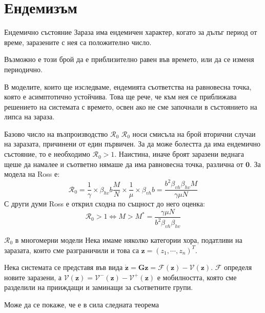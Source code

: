 \section{Ендемизъм}
\begin{frame}[t]{Ендемично състояние}
  Зараза има ендемичен характер, когато за дълъг период от време, заразените с нея са положително число.

  Възможно е този брой да е приблизително равен във времето, или да се изменя периодично.

  В моделите, които ще изследваме, ендемията съответства на равновесна точка, която е асимптотично устойчива. Това ще рече, че към нея се приближава решението на системата с времето, освен ако не сме започнали в състоянието на липса на зараза.
\end{frame}

\begin{frame}[t]{Базово число на възпроизводство $\mathscr{R}_0$}
  $\mathscr{R}_0$ носи смисъла на брой вторични случаи на заразата, причинени от един първичен. За да може болестта да има ендемично състояние, то е необходимо $\mathscr{R}_0 > 1$.
  Наистина, иначе броят заразени веднага щеше да намалее и съответно нямаше да има равновесна точка, различна от $\mathbf{0}$. За модела на Ross е:
  \begin{equation}
    \mathscr{R}_0 = \frac{1}{\gamma} \times \beta_{hv} b \frac{M}{N} \times \frac{1}{\mu} \times \beta_{vh} b = \frac{b^2 \beta_{vh} \beta_{hv} M}{\gamma \mu N}
  \end{equation}
  С други думи Ross е открил сходна по същност до него оценка:
  \begin{equation}
    \mathscr{R}_0 > 1 \iff M > M^* = \frac{\gamma \mu N}{b^2 \beta_{vh} \beta_{hv}}
  \end{equation}
\end{frame}

\begin{frame}[t]{$\mathscr{R}_0$ в многомерни модели}
  Нека имаме няколко категории хора, податливи на заразата, които сме разграничили и това са $\mathbf{z} = (z_1, \cdots, z_n)^T$.

  Нека системата се представя във вида $\dot{\mathbf{z}} = \mathbf{G}{\mathbf{z}} = \mathscr{F}(\mathbf{z}) - \mathscr{V}(\mathbf{z})$.
  $\mathscr{F}$ определя новите заразени, а $\mathscr{V}(\mathbf{z}) = \mathscr{V}^-(\mathbf{z}) - \mathscr{V}^+(\mathbf{z})$ е мобилността, която сме разделили на прииждащи и заминащи за съответните групи.

  Може да се покаже, че е в сила следната теорема
\end{frame}

